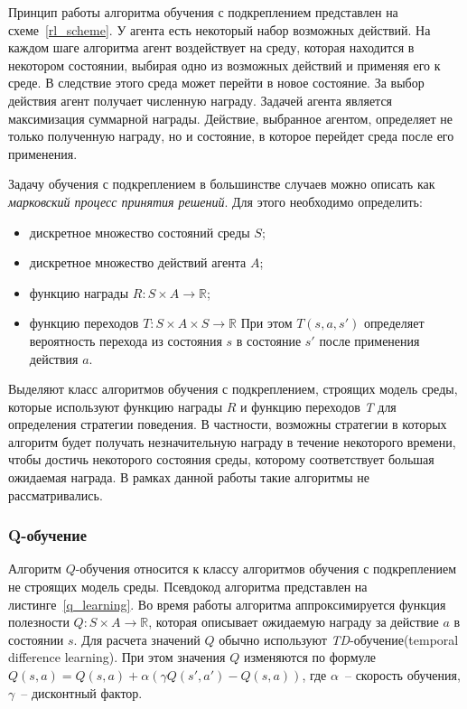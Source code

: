 Принцип работы алгоритма обучения с подкреплением представлен на схеме~\ref{rl_scheme}. У агента есть некоторый набор возможных действий. На каждом шаге алгоритма агент воздействует на среду, которая находится в некотором состоянии, выбирая одно из возможных действий и применяя его к среде. В следствие этого среда может перейти в новое состояние. За выбор действия агент получает численную награду. Задачей агента является максимизация суммарной награды. Действие, выбранное агентом, определяет не только полученную награду, но и состояние, в которое перейдет среда после его применения.

Задачу обучения с подкреплением в большинстве случаев можно описать как \textit{марковский процесс принятия решений}. Для этого необходимо определить:

\begin{itemize}
    \item дискретное множество состояний среды $S$;
    \item дискретное множество действий агента $A$;
    \item функцию награды $R : S \times A \rightarrow \mathbb{R}$;
    \item функцию переходов $T : S \times A \times S \rightarrow \mathbb{R}$ При этом $T(s, a, s')$ определяет вероятность перехода из состояния $s$ в состояние $s'$ после применения действия $a$.
\end{itemize}

Выделяют класс алгоритмов обучения с подкреплением, строящих модель среды, которые используют функцию награды $R$ и функцию переходов \textit{T} для определения стратегии поведения. В частности, возможны стратегии в которых алгоритм будет получать незначительную награду в течение некоторого времени, чтобы достичь некоторого состояния среды, которому соответствует большая ожидаемая награда. В рамках данной работы такие алгоритмы не рассматривались.

\subsubsection{Q-обучение}

Алгоритм $Q$-обучения относится к классу алгоритмов обучения с подкреплением не строящих модель среды. Псевдокод алгоритма представлен на листинге~\ref{q_learning}. Во время работы алгоритма аппроксимируется функция полезности $Q : S \times A \rightarrow \mathbb{R}$, которая описывает ожидаемую награду за действие $a$ в состоянии $s$. Для расчета значений $Q$ обычно используют \textit{TD}-обучение(temporal difference learning). При этом значения $Q$ изменяются по формуле $Q(s, a) = Q(s, a) + \alpha (\gamma Q(s', a') - Q(s, a))$, где $\alpha$~-- скорость обучения, $\gamma$~-- дисконтный фактор.

